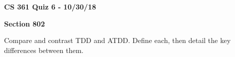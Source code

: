 \documentclass{exam}
\begin{document}
\begin{center}
	\textbf{CS 361 Quiz 6 - 10/30/18}
	
	\textbf{Section 802}
	
	\vspace{1em}
	
\end{center}

\begin{questions}
	
\question[10] Compare and contrast TDD and ATDD. Define each, then detail the key differences between them.

\end{questions}
\end{document}

